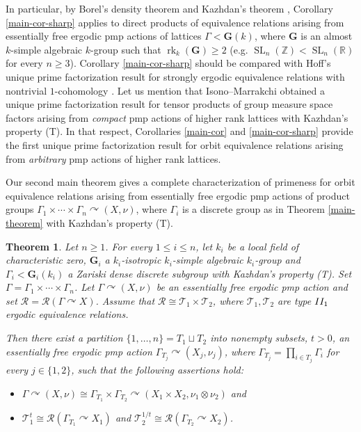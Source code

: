 \documentclass[11pt]{amsart}
\numberwithin{equation}{section}
\theoremstyle{plain}
\newtheorem{letterthm}{Theorem}
\theoremstyle{definition}
\newcommand{\R}{\mathbb{R}}
\newcommand{\Z}{\mathbb{Z}}
\newcommand{\SL}{\operatorname{SL}}
\newcommand{\rk}{\operatorname{rk}}
\begin{document}
In particular, by Borel's density theorem \cite{Bo60} and Kazhdan's theorem \cite{Ka66}, Corollary \ref{main-cor-sharp} applies to direct products of equivalence relations arising from essentially free ergodic pmp actions of lattices $\Gamma < \mathbf G(k)$, where $\mathbf G$ is an almost $k$-simple algebraic $k$-group such that $\rk_k(\mathbf G) \geq 2$ (e.g.\! $\SL_n(\Z) < \SL_n(\R)$ for every $n \geq 3$). Corollary \ref{main-cor-sharp} should be compared with Hoff's unique prime factorization result for strongly ergodic equivalence relations with nontrivial $1$-cohomology \cite{Ho15}. Let us mention that Isono--Marrakchi \cite{IM19} obtained a unique prime factorization result for tensor products of group measure space factors arising from {\em compact} pmp actions of higher rank lattices with Kazhdan's property (T). In that respect, Corollaries \ref{main-cor} and \ref{main-cor-sharp} provide the first unique prime factorization result for orbit equivalence relations arising from {\em arbitrary} pmp actions of higher rank lattices.

Our second main theorem gives a complete characterization of primeness for orbit equivalence relations arising from essentially free ergodic pmp actions of product groups $\Gamma_1 \times \cdots \times \Gamma_n \curvearrowright (X, \nu)$, where $\Gamma_i$ is a discrete group as in Theorem \ref{main-theorem} with Kazhdan's property (T). 


\begin{letterthm}\label{main-theorem-decomposition}
Let $n \geq 1$. For every $1 \leq i \leq n$, let $k_i$ be a local field of characteristic zero, $\mathbf G_i$ a $k_i$-isotropic $k_i$-simple algebraic $k_i$-group and $\Gamma_i < \mathbf G_i(k_i)$ a Zariski dense discrete subgroup with Kazhdan's property {\em (T)}. Set $\Gamma = \Gamma_1 \times \cdots \times \Gamma_n$. Let $\Gamma \curvearrowright (X, \nu)$ be an essentially free ergodic pmp action and set $\mathscr R = \mathscr R(\Gamma \curvearrowright X)$. Assume that $\mathscr R \cong \mathscr T_1 \times \mathscr T_2$, where $\mathscr T_1, \mathscr T_2$ are type ${\rm II_1}$ ergodic equivalence relations.

Then there exist a partition $\{1, \dots, n\} = T_1 \sqcup T_2$ into nonempty subsets, $t > 0$, an essentially free ergodic pmp action $\Gamma_{T_j} \curvearrowright (X_j, \nu_j)$, where $\Gamma_{T_j} = \prod_{i \in T_j} \Gamma_i$ for every $j \in \{1, 2\}$, such that the following assertions hold: 
\begin{itemize}
\item [$(\rm i)$] $\Gamma \curvearrowright (X, \nu) \cong \Gamma_{T_1} \times \Gamma_{T_2} \curvearrowright (X_1 \times X_2, \nu_1 \otimes \nu_2)$ and
\item [$(\rm ii)$] $\mathscr T_1^t \cong \mathscr R(\Gamma_{T_1} \curvearrowright X_1)$ and  $\mathscr T_2^{1/t} \cong\mathscr R(\Gamma_{T_2} \curvearrowright X_2)$.
\end{itemize}
\end{letterthm}
\end{document}
